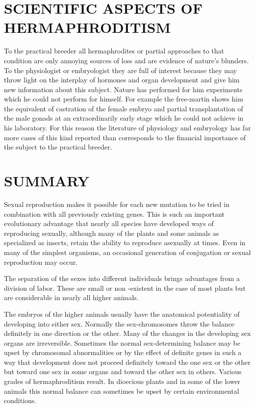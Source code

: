 \section*{SCIENTIFIC ASPECTS OF HERMAPHRODITISM}

To the practical breeder all hermaphrodites or partial approaches
to that condition are only annoying sources of loss and are evidence of
nature's blunders. To the physiologist or embryologist they are full of
interest because they may throw light on the interplay of hormones
and organ development and give him new information about this subject.
Nature has performed for him experiments which he could not
perform for himself. For example the free-martin shows him the equivalent
of castration of the female embryo and partial transplantation of
the male gonads at an extraordinarily early stage which he could not
achieve in his laboratory. For this reason the literature of physiology
and embryology has far more cases of this kind reported than corresponds
to the financial importance of the subject to the practical breeder.
\noclub

\section*{SUMMARY}

Sexual reproduction makes it possible for each new mutation to be
tried in combination with all previously existing genes. This is such an
important evolutionary advantage that nearly all species have developed
ways of reproducing sexually, although many of the plants and
some animals as specialized as insects, retain the ability to reproduce
asexually at times. Even in many of the simplest organisms, an occasional
generation of conjugation or sexual reproduction may occur.

The separation of the sexes into different individuals brings advantages
from a division of labor. These are small or non -existent in the
case of most plants but are considerable in nearly all higher animals.

The embryos of the higher animals usually have the anatomical
potentiality of developing into either sex. Normally the sex-chromosomes
throw the balance definitely in one direction or the other. Many
of the changes in the developing sex organs are irreversible. Sometimes
the normal sex-determining balance may be upset by chromosomal
abnormalities or by the effect of definite genes in such a way that development
does not proceed definitely toward the one sex or the other
but toward one sex in some organs and toward the other sex in others.
Various grades of hermaphroditism result. In dioecious plants and in
some of the lower animals this normal balance can sometimes be upset
by certain environmental conditions.

